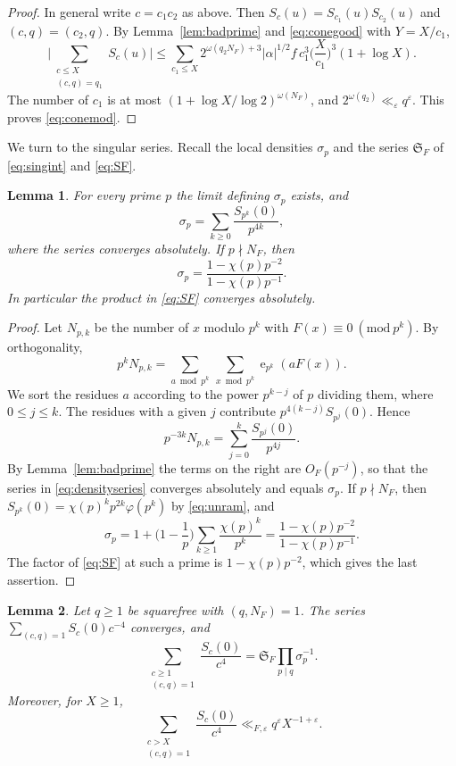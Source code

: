 \documentclass[11pt]{amsart}
\numberwithin{equation}{section}
\numberwithin{figure}{section}
\newtheorem{lemma}{Lemma}[section]
\theoremstyle{definition}
\newcommand{\e}{\operatorname{e}}
\newcommand{\imod}[1]{\ (\mathrm{mod}\ #1)}
\renewcommand{\S}{\mathfrak{S}}
\newcommand{\eps}{\varepsilon}
\newcommand{\abs}[1]{\lvert #1\rvert}
\begin{document}
\begin{proof}
In general write $c=c_1c_2$ as above. Then
$S_c(u)=S_{c_1}(u)S_{c_2}(u)$ and $(c,q)=(c_2,q)$. By
Lemma~\ref{lem:badprime} and \eqref{eq:conegood} with $Y=X/c_1$,
\[
 \bigg|\sum_{\substack{c\le X\\(c,q)=q_1}}S_c(u)\bigg|
 \le\sum_{c_1\le X}2^{\omega(q_2N_F)+3}\abs\alpha^{1/2}f\,c_1^3
 \Big(\frac X{c_1}\Big)^3(1+\log X).
\]
The number of $c_1$ is at most $(1+\log X/\log2)^{\omega(N_F)}$, and
$2^{\omega(q_2)}\ll_\eps q^\eps$. This proves \eqref{eq:conemod}.
\end{proof}

We turn to the singular series. Recall the local densities
$\sigma_p$ and the series $\S_F$ of \eqref{eq:singint} and
\eqref{eq:SF}.

\begin{lemma}\label{lem:density}
For every prime $p$ the limit defining $\sigma_p$ exists, and
\begin{equation}\label{eq:densityseries}
 \sigma_p=\sum_{k\ge0}\frac{S_{p^k}(0)}{p^{4k}},
\end{equation}
where the series converges absolutely. If $p\nmid N_F$, then
\begin{equation}\label{eq:sigmagood}
 \sigma_p=\frac{1-\chi(p)p^{-2}}{1-\chi(p)p^{-1}}.
\end{equation}
In particular the product in \eqref{eq:SF} converges absolutely.
\end{lemma}

\begin{proof}
Let $N_{p,k}$ be the number of $x$ modulo $p^k$ with
$F(x)\equiv0\imod{p^k}$. By orthogonality,
\[
 p^kN_{p,k}=\sum_{a\bmod p^k}\ \sum_{x\bmod p^k}\e_{p^k}(aF(x)).
\]
We sort the residues $a$ according to the power $p^{k-j}$ of $p$
dividing them, where $0\le j\le k$. The residues with a given $j$
contribute $p^{4(k-j)}S_{p^j}(0)$. Hence
\[
 p^{-3k}N_{p,k}=\sum_{j=0}^k\frac{S_{p^j}(0)}{p^{4j}}.
\]
By Lemma~\ref{lem:badprime} the terms on the right are
$O_F(p^{-j})$, so that the series in \eqref{eq:densityseries}
converges absolutely and equals $\sigma_p$. If $p\nmid N_F$, then
$S_{p^k}(0)=\chi(p)^kp^{2k}\varphi(p^k)$ by \eqref{eq:unram}, and
\[
 \sigma_p=1+\Big(1-\frac1p\Big)\sum_{k\ge1}\frac{\chi(p)^k}{p^k}
 =\frac{1-\chi(p)p^{-2}}{1-\chi(p)p^{-1}}.
\]
The factor of \eqref{eq:SF} at such a prime is $1-\chi(p)p^{-2}$,
which gives the last assertion.
\end{proof}

\begin{lemma}\label{lem:singseries}
Let $q\ge1$ be squarefree with $(q,N_F)=1$. The series
$\sum_{(c,q)=1}S_c(0)c^{-4}$ converges, and
\begin{equation}\label{eq:seriesfactor}
 \sum_{\substack{c\ge1\\(c,q)=1}}\frac{S_c(0)}{c^4}
 =\S_F\prod_{p\mid q}\sigma_p^{-1}.
\end{equation}
Moreover, for $X\ge1$,
\begin{equation}\label{eq:seriestail}
 \sum_{\substack{c>X\\(c,q)=1}}\frac{S_c(0)}{c^4}\ll_{F,\eps}q^\eps X^{-1+\eps}.
\end{equation}
\end{lemma}
\end{document}
